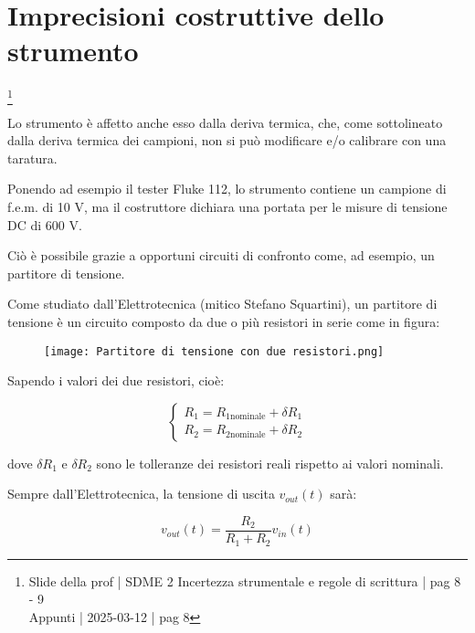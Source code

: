 \newpage 

\section{Imprecisioni costruttive dello strumento}
\footnote{Slide della prof | SDME 2 Incertezza strumentale e regole di scrittura | pag 8 - 9 \\  
Appunti | 2025-03-12 | pag 8}

Lo strumento è affetto anche esso dalla deriva termica, che, come sottolineato dalla deriva termica dei campioni, non si può modificare e/o 
calibrare con una taratura. \newline 

Ponendo ad esempio il tester Fluke 112, lo strumento contiene un campione di f.e.m. di 10 V, ma il costruttore dichiara una portata per le misure di tensione 
DC di 600 V. \newline

Ciò è possibile grazie a opportuni circuiti di confronto come, ad esempio, 
un partitore di tensione. \newline 

Come studiato dall'Elettrotecnica (mitico Stefano Squartini), 
un partitore di tensione è un circuito composto da due o più resistori in serie come in figura: 

\begin{figure}[h]
    \centering
    \texttt{[image: Partitore di tensione con due resistori.png]}
\end{figure}

Sapendo i valori dei due resistori, cioè:

{
    \Large 
    \begin{equation} 
        \begin{cases}
            R_1 = R_{1 \text{nominale}} + \delta R_1
            \\ 
            R_2 = R_{2 \text{nominale}} + \delta R_2
        \end{cases}
    \end{equation}
}

dove $\delta R_1$ e $\delta R_2$ sono le tolleranze dei resistori reali rispetto ai valori nominali. \newline 

Sempre dall'Elettrotecnica, la tensione di uscita $v_{out} (t)$ sarà: 

{
    \Large 
    \begin{equation}
        v_{out} (t)
        = 
        \frac{R_2}{R_1 + R_2} v_{in} (t)
    \end{equation}
}


